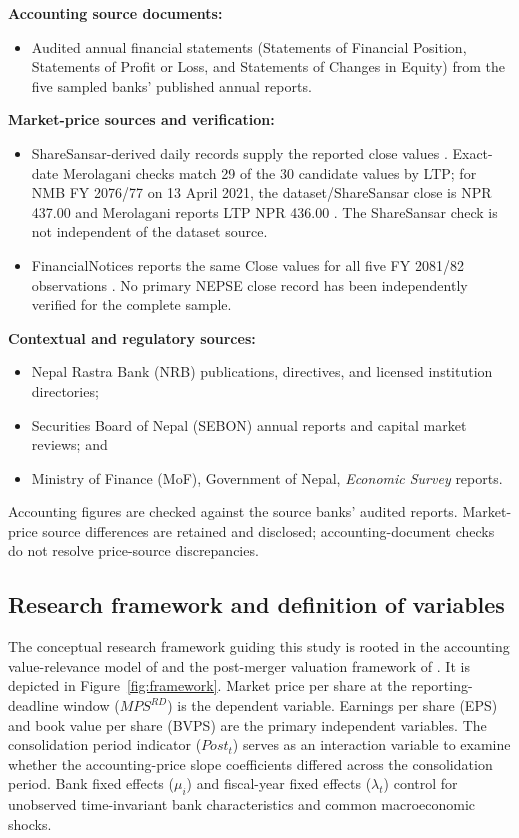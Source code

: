 \textbf{Accounting source documents:}
\begin{itemize}
  \item Audited annual financial statements (Statements of Financial Position, Statements of Profit or Loss, and Statements of Changes in Equity) from the five sampled banks' published annual reports.
\end{itemize}

\textbf{Market-price sources and verification:}
\begin{itemize}
  \item ShareSansar-derived daily records supply the reported close values \citep{sharesansar2026}. Exact-date Merolagani checks match 29 of the 30 candidate values by LTP; for NMB FY 2076/77 on 13 April 2021, the dataset/ShareSansar close is NPR 437.00 and Merolagani reports LTP NPR 436.00 \citep{merolagani2026}. The ShareSansar check is not independent of the dataset source.
  \item FinancialNotices reports the same Close values for all five FY 2081/82 observations \citep{financialnotices2026}. No primary NEPSE close record has been independently verified for the complete sample.
\end{itemize}

\textbf{Contextual and regulatory sources:}
\begin{itemize}
  \item Nepal Rastra Bank (NRB) publications, directives, and licensed institution directories;
  \item Securities Board of Nepal (SEBON) annual reports and capital market reviews; and
  \item Ministry of Finance (MoF), Government of Nepal, \textit{Economic Survey} reports.
\end{itemize}
Accounting figures are checked against the source banks' audited reports. Market-price source differences are retained and disclosed; accounting-document checks do not resolve price-source discrepancies.

\subsection{Research framework and definition of variables}
The conceptual research framework guiding this study is rooted in the accounting value-relevance model of \citet{ohlson1995} and the post-merger valuation framework of \citet{kwon2020}. It is depicted in Figure~\ref{fig:framework}. Market price per share at the reporting-deadline window ($\mathit{MPS}^{RD}$) is the dependent variable. Earnings per share (EPS) and book value per share (BVPS) are the primary independent variables. The consolidation period indicator ($\mathit{Post}_t$) serves as an interaction variable to examine whether the accounting-price slope coefficients differed across the consolidation period. Bank fixed effects ($\mu_i$) and fiscal-year fixed effects ($\lambda_t$) control for unobserved time-invariant bank characteristics and common macroeconomic shocks.

